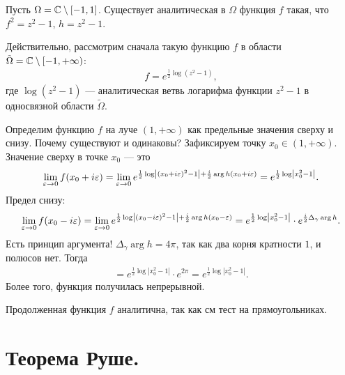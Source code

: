 \documentclass[../../main.tex]{subfiles}
\begin{document}
\begin{exmpl}
 Пусть $ \Omega = \mathbb{C} \setminus [-1, 1] $. Существует аналитическая в $ \Omega $ функция $ f $ такая, что $ f^{2} = z^{2} - 1 $, $ h = z^{2}-1 $.

 Действительно,  рассмотрим сначала такую функцию $ f $ в области $ \tilde \Omega  = \mathbb{C} \setminus [-1, +\infty)$:
 \begin{align*}
  f = e^{\frac{1}{2}\log(z^{2} - 1)},
 \end{align*} где $ \log(z^{2} - 1) $ --- аналитическая ветвь логарифма функции $ z^{2}-1 $ в односвязной области $ \tilde \Omega $.

 Определим функцию $ f $ на луче $ (1, +\infty) $ как предельные значения сверху и снизу. Почему существуют и одинаковы? Зафиксируем точку $ x_0 \in (1, +\infty) $. Значение сверху в точке $ x_0 $ --- это
 \begin{align*}
  \lim_{\varepsilon \to 0} f(x_0 + i\varepsilon) = \lim_{\varepsilon \to 0} e^{\frac{1}{2}\log \left| (x_0+i\varepsilon)^{2} - 1 \right| + \frac{i}{2}\arg h(x_0 + i\varepsilon)} = e^{\frac{1}{2}\log \left| x_0^{2}-1 \right|}.
 \end{align*} Предел снизу:
 \begin{align*}
  \lim_{\varepsilon \to 0} f(x_0 - i\varepsilon) = \lim_{\varepsilon \to 0} e^{\frac{1}{2} \log \left| (x_0 -i\varepsilon)^{2}-1 \right| + \frac{i}{2}\arg h(x_0-\varepsilon)} = e^{\frac{1}{2} \log \left| x_0^{2}-1 \right|} \cdot e^{\frac{i}{2} \Delta_\gamma \arg h}.
 \end{align*} Есть принцип аргумента! $ \Delta_{\gamma} \arg h = 4\pi $, так как два корня кратности $ 1 $, и полюсов нет. Тогда
 \begin{align*}
  = e^{\frac{1}{2}\log \left| x_0^{2}-1 \right|} \cdot e^{2\pi} = e^{\frac{1}{2} \log \left| x_0^{2}-1 \right|}.
 \end{align*} Более того, функция получилась непрерывной.

 Продолженная функция $ f $ аналитична, так как см тест на прямоугольниках.
\end{exmpl}

\newpage
\section{Теорема Руше.}
\end{document}
